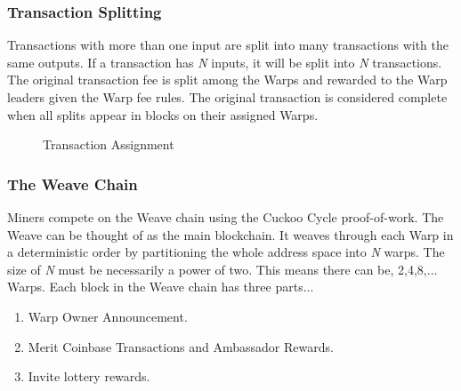 \documentclass{article}
\begin{document}
\subsubsection{Transaction Splitting}

Transactions with more than one input are split into many transactions with the same
outputs. If a transaction has \emph{N} inputs, it will be split into \emph{N} transactions. The original transaction fee is split among the Warps and rewarded to the Warp
leaders given the Warp fee rules. The original transaction is considered complete when
all splits appear in blocks on their assigned Warps.

\begin{figure}[H]
    \begin{center}
    \end{center}
    \caption{Transaction Assignment}
\end{figure}

\subsubsection{The Weave Chain}

Miners compete on the Weave chain using the Cuckoo Cycle proof-of-work. 
The Weave can be thought of as the main blockchain. It weaves through each Warp
in a deterministic order by partitioning the whole address space into \emph{N} warps.
The size of \emph{N} must be necessarily a power of two. This means there can be,
2,4,8,... Warps. Each block in the Weave chain has three parts...

\begin{enumerate}
    \item Warp Owner Announcement.
    \item Merit Coinbase Transactions and Ambassador Rewards.
    \item Invite lottery rewards.
\end{enumerate}
\end{document}

